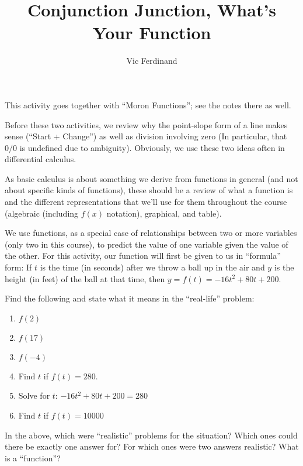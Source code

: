 \documentclass{ximera}
\author{Vic Ferdinand}
\title{Conjunction Junction, What's Your Function}
\begin{document}
\begin{abstract}
\end{abstract}
\maketitle

\begin{instructorIntro}
This activity goes together with ``Moron Functions''; see the notes there as well.

Before these two activities, we review why the point-slope form of a line makes sense (``Start + Change'') as well as division involving zero (In particular, that $0/0$ is undefined due to ambiguity).  Obviously, we use these two ideas often in differential calculus.

As basic calculus is about something we derive from functions in general (and not about specific kinds of functions), these should be a review of what a function is and the different representations that we'll use for them throughout the course (algebraic (including $f(x)$ notation), graphical, and table).  
\end{instructorIntro}


We use functions, as a special case of relationships between two or more variables (only two in this course), to predict the value of one variable given the value of the other.  For this activity, our function will first be given to us in ``formula'' form:  If $t$ is the time (in seconds) after we throw a ball up in the air and $y$ is the height (in feet) of the ball at that time, then  $y = f(t) = -16t^2+80t+200$.  

\begin{question} 
Find the following and state what it means in the ``real-life'' problem:
\begin{enumerate}
    \item $f(2)$
    \item $f(17)$
    \item $f(-4)$
    \item Find $t$ if $f(t) = 280$.
    \item Solve for $t$: $-16t^2+80t+200 = 280$
    \item Find $t$ if $f(t) = 10000$
\end{enumerate}
\end{question}


In the above, which were ``realistic'' problems for the situation?  Which ones could there be exactly one answer for?  For which ones were two answers realistic?  What is a ``function''?
\end{document}
